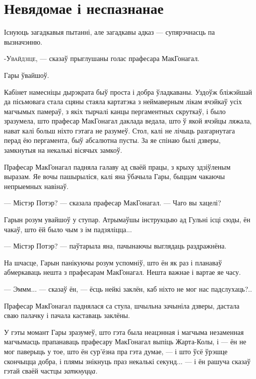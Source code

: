 \chapter{Невядомае і неспазнанае}

\begin{chapterOpeningQuote}
Існуюць загадкавыя пытанні, але загадкавы адказ --- супярэчнасць па вызначэнню.
\end{chapterOpeningQuote}

\lettrine[lines=1,lraise=-0.1]{-У}{вайдзіце,} --- сказаў прыглушаны голас прафесара МакГонагал.

Гары ўвайшоў.

Кабінет намесніцы дырэкрата быў проста і добра ўладкаваны. Уздоўж бліжэйшай да
пісьмовага стала сцяны стаяла картатэка з неймаверным лікам ячэйкаў 
усіх магчымых памераў, з якіх тырчалі канцы пергаментных скруткаў, і было зразумела,
што прафесар МакГонагал даклада ведала, што ў якой ячэйцы ляжала, нават калі больш 
ніхто гэтага не разумеў. Стол, калі не лічыць разгарнутага перад ёю пергамента, 
быў абсалютна пусты. 
За яе спінаю былі дзверы, замкнутыя на некалькі вісячых замкоў.

Прафесар МакГонагал падняла галаву ад сваёй працы, з крыху здзіўленым выразам. 
Яе вочы пашырыліся, калі яна ўбачыла Гары, быццам чакаючы непрыемных навінаў.

--- Містэр Потэр? --- сказала прафесар МакГонагал. --- Чаго вы хацелі?

Гарын розум увайшоў у ступар. Атрымаўшы інструкцыю ад Гульні ісці сюды, ён чакаў,
што ёй было чым з ім падзяліцца...

--- Містэр Потэр? --- паўтарыла яна, пачынаючы выглядаць раздражнёна.

На шчасце, Гарын панікуючы розум успомніў, што ён як раз і планаваў абмеркаваць нешта 
з прафесарам МакГонагал. Нешта важнае і вартае яе часу.

--- Эммм... --- сказаў ён, --- ёсць нейкі заклён, каб ніхто не мог нас падслухаць?..

Прафесар МакГонагал паднялася са стула, шчыльна зачыніла дзверы, дастала сваю 
палачку і пачала каставаць заклёны.

У гэты момант Гары зразумеў, што гэта была неацэнная і магчыма незаменная магчымасць
прапанаваць прафесару МакГонагал выпіць Жарта-Колы, і --- ён не мог паверыць у тое,
што ён сур'ёзна пра гэта думае, --- і што ўсё ўрэшце скончыцца добра, і 
плямы знікнуць праз некалькі секунд... --- і ён рашуча сказаў гэтай сваёй частцы 
\emph{заткнуцца.}

